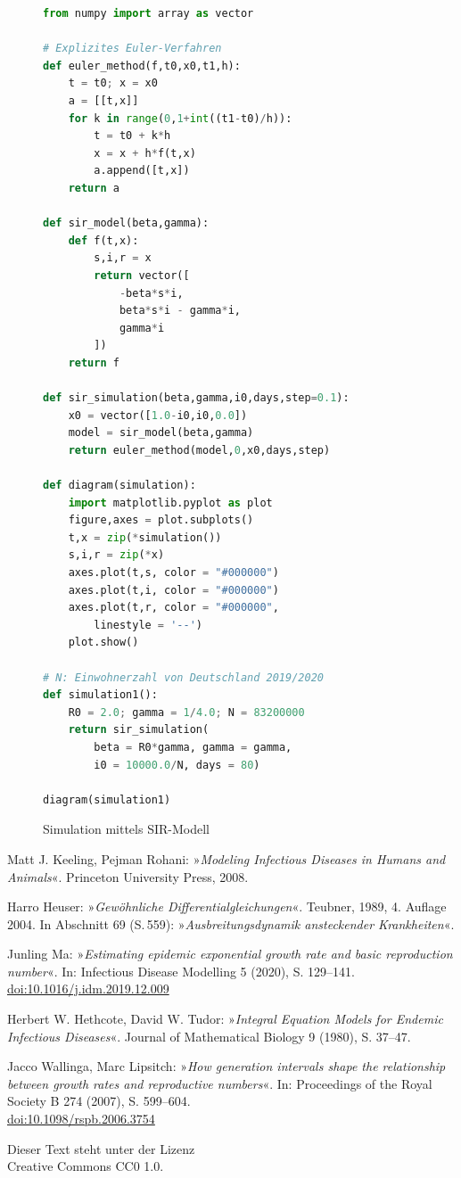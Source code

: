 \documentclass[a4paper,10pt,fleqn,twocolumn,twoside,dvipdfmx]{scrartcl}
\numberwithin{equation}{section}
\begin{document}
\begin{figure}[h!]
\begin{lstlisting}[language=Python]
from numpy import array as vector

# Explizites Euler-Verfahren
def euler_method(f,t0,x0,t1,h):
    t = t0; x = x0
    a = [[t,x]]
    for k in range(0,1+int((t1-t0)/h)):
        t = t0 + k*h
        x = x + h*f(t,x)
        a.append([t,x])
    return a

def sir_model(beta,gamma):
    def f(t,x):
        s,i,r = x
        return vector([
            -beta*s*i,
            beta*s*i - gamma*i,
            gamma*i
        ])
    return f

def sir_simulation(beta,gamma,i0,days,step=0.1):
    x0 = vector([1.0-i0,i0,0.0])
    model = sir_model(beta,gamma)
    return euler_method(model,0,x0,days,step)

def diagram(simulation):
    import matplotlib.pyplot as plot
    figure,axes = plot.subplots()
    t,x = zip(*simulation())
    s,i,r = zip(*x)
    axes.plot(t,s, color = "#000000")
    axes.plot(t,i, color = "#000000")
    axes.plot(t,r, color = "#000000",
        linestyle = '--')
    plot.show()

# N: Einwohnerzahl von Deutschland 2019/2020
def simulation1():
    R0 = 2.0; gamma = 1/4.0; N = 83200000
    return sir_simulation(
        beta = R0*gamma, gamma = gamma,
        i0 = 10000.0/N, days = 80)

diagram(simulation1)
\end{lstlisting}
\caption{Simulation mittels SIR-Modell}
\end{figure}

\newpage
\begin{thebibliography}{00}
 Matt J. Keeling, Pejman Rohani:
»\emph{Modeling Infectious Diseases in Humans and Animals}«.
Princeton University Press, 2008.

 Harro Heuser: »\emph{Gewöhnliche Differentialgleichungen}«.
Teubner, 1989, 4. Auflage 2004. In Abschnitt 69 (S.\,559):
»\emph{Ausbreitungsdynamik ansteckender Krankheiten}«.

 Junling Ma: »\emph{Estimating epidemic exponential growth
rate and basic reproduction number}«. In: Infectious Disease Modelling 5
(2020), S. 129--141.\\
\href{https://doi.org/10.1016/j.idm.2019.12.009}%
{doi:10.1016/j.idm.2019.12.009}

 Herbert W. Hethcote, David W. Tudor:
»\emph{Integral Equation Models for Endemic Infectious Diseases}«.
Journal of Mathematical Biology 9 (1980), S. 37--47.

 Jacco Wallinga, Marc Lipsitch:
»\emph{How generation intervals shape the relationship
between growth rates and reproductive numbers}«.
In: Proceedings of the Royal Society B 274 (2007), S. 599--604.\\
\href{https://doi.org/10.1098/rspb.2006.3754}{doi:10.1098/rspb.2006.3754}
\end{thebibliography}
\vfill

\noindent
{\small Dieser Text steht unter der Lizenz\\
Creative Commons CC0 1.0.}
\end{document}
